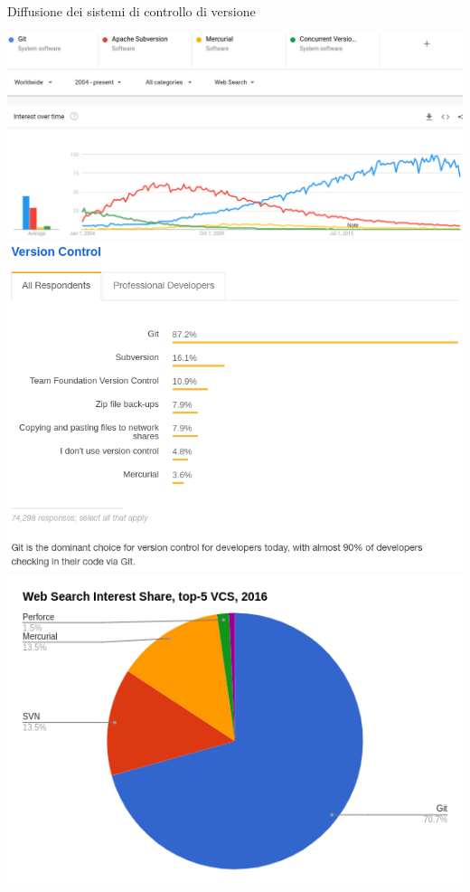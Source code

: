 \documentclass[xcolor=dvipsnames,presentation]{beamer}
\begin{document}
\begin{frame}[allowframebreaks]{Diffusione dei sistemi di controllo di versione}
    \begin{center}
        \includegraphics[width=\textwidth, height=.77\textheight, keepaspectratio]{img/gtrends} \\
        \includegraphics[width=\textwidth, height=.77\textheight, keepaspectratio]{img/stackoverflow} \\
        \includegraphics[width=\textwidth, height=.77\textheight, keepaspectratio]{img/interest} \\

\end{center}
\end{frame}
\end{document}
